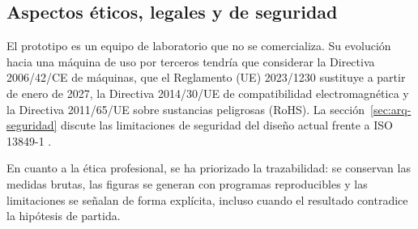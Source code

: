\subsection{Aspectos éticos, legales y de seguridad}

El prototipo es un equipo de laboratorio que no se comercializa. Su evolución hacia una máquina de
uso por terceros tendría que considerar la Directiva 2006/42/CE de máquinas, que el Reglamento (UE)
2023/1230 sustituye a partir de enero de 2027, la Directiva 2014/30/UE de compatibilidad
electromagnética y la Directiva 2011/65/UE sobre sustancias peligrosas (RoHS). La
sección~\ref{sec:arq-seguridad} discute las limitaciones de seguridad del diseño actual frente a
ISO 13849-1 \cite{iso13849}.

En cuanto a la ética profesional, se ha priorizado la trazabilidad: se conservan las medidas brutas,
las figuras se generan con programas reproducibles y las limitaciones se señalan de forma explícita,
incluso cuando el resultado contradice la hipótesis de partida.
